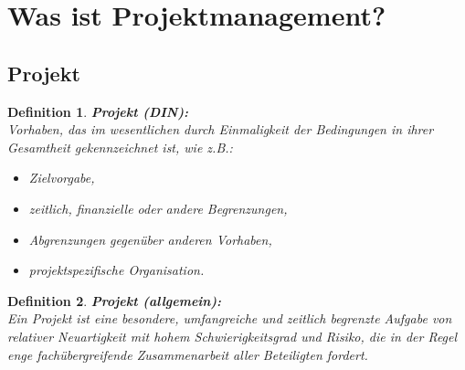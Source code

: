 \documentclass[11pt,a4paper]{article}
\author{Ward Schodts}
\newenvironment{de}[1]
{\begin{mdframed}[style=de]\begin{mydef}{\textbf{#1:}}\\} 
{\end{mydef}\end{mdframed}}
\newtheorem{mydef}{Definition}
\begin{document}
\section{Was ist Projektmanagement?}
\subsection{Projekt}

\begin{de}{Projekt (DIN)}
Vorhaben, das im wesentlichen durch  Einmaligkeit der Bedingungen in ihrer Gesamtheit gekennzeichnet ist, wie z.B.:
\begin{itemize}
\setlength\itemsep{0em}
\item Zielvorgabe,
\item zeitlich, finanzielle oder andere Begrenzungen,
\item Abgrenzungen gegenüber anderen Vorhaben,
\item projektspezifische Organisation.
\end{itemize}

\end{de}

\begin{de}{Projekt (allgemein)}
Ein Projekt ist eine besondere, umfangreiche und zeitlich begrenzte
Aufgabe von relativer Neuartigkeit mit hohem Schwierigkeitsgrad und
Risiko, die in der Regel enge fachübergreifende Zusammenarbeit aller
Beteiligten fordert.
\end{de}
\end{document}
